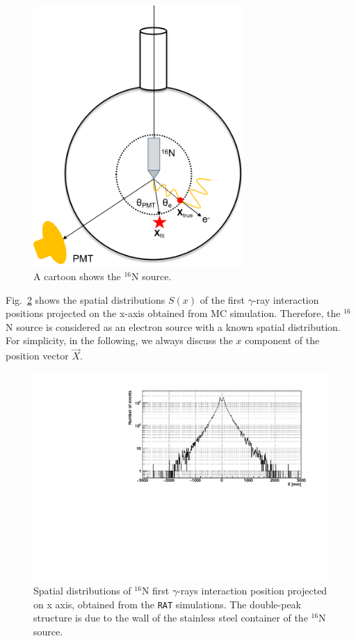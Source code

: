 \begin{figure}[!htb]
	\centering
	\includegraphics[width=8cm]{N16centralDiagram.png}
	\caption{A cartoon shows the $^{16}$N source.}
	\label{N16centralDiagram}
\end{figure}

Fig.~\ref{hsx} shows the spatial distributions $S(x)$ of the first $\gamma$-ray interaction positions projected on the x-axis obtained from MC simulation. Therefore, the $^{16}$N source is considered as an electron source with a known spatial distribution\cite{boulay2004direct}. For simplicity, in the following, we always discuss the $x$ component of the position vector $\vec{X}$. 

\begin{figure}[!htb]
	\centering
	\includegraphics[width=12cm]{sx.pdf}
	\caption[Spatial distributions of {$^{16}$}N first $\gamma$-rays interaction position projected on x axis.]{Spatial distributions of {$^{16}$}N first $\gamma$-rays interaction position projected on x axis, obtained from the \texttt{RAT} simulations. The double-peak structure is due to the wall of the stainless steel container of the $^{16}$N source.}
	\label{hsx}
\end{figure}


